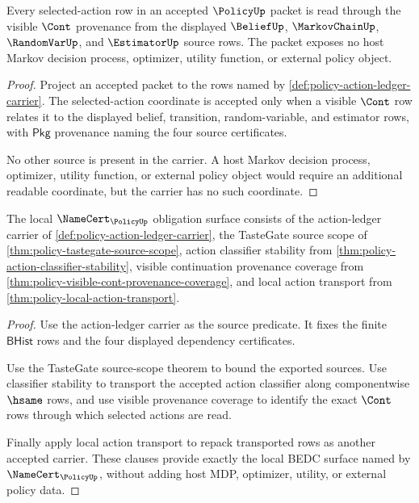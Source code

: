 \begin{theorem}
\label{thm:policy-visible-cont-provenance-coverage}
Every selected-action row in an accepted $\PolicyUp$ packet is read through the
visible $\Cont$ provenance from the displayed $\BeliefUp$,
$\MarkovChainUp$, $\RandomVarUp$, and $\EstimatorUp$ source rows. The packet
exposes no host Markov decision process, optimizer, utility function, or
external policy object.
\end{theorem}
\begin{proof}
Project an accepted packet to the rows named by
\autoref{def:policy-action-ledger-carrier}. The selected-action coordinate is
accepted only when a visible $\Cont$ row relates it to the displayed belief,
transition, random-variable, and estimator rows, with $\mathsf{Pkg}$
provenance naming the four source certificates.

No other source is present in the carrier. A host Markov decision process,
optimizer, utility function, or external policy object would require an
additional readable coordinate, but the carrier has no such coordinate.
\end{proof}

\begin{theorem}
\label{thm:policy-namecert-obligation-surface}
The local $\NameCert_{\PolicyUp}$ obligation surface consists of the
action-ledger carrier of \autoref{def:policy-action-ledger-carrier}, the
TasteGate source scope of \autoref{thm:policy-tastegate-source-scope}, action
classifier stability from
\autoref{thm:policy-action-classifier-stability}, visible continuation
provenance coverage from
\autoref{thm:policy-visible-cont-provenance-coverage}, and local action
transport from \autoref{thm:policy-local-action-transport}.
\end{theorem}
\begin{proof}
Use the action-ledger carrier as the source predicate. It fixes the finite
$\mathsf{BHist}$ rows and the four displayed dependency certificates.

Use the TasteGate source-scope theorem to bound the exported sources. Use
classifier stability to transport the accepted action classifier along
componentwise $\hsame$ rows, and use visible provenance coverage to identify
the exact $\Cont$ rows through which selected actions are read.

Finally apply local action transport to repack transported rows as another
accepted carrier. These clauses provide exactly the local BEDC surface named
by $\NameCert_{\PolicyUp}$, without adding host MDP, optimizer, utility, or
external policy data.
\end{proof}

